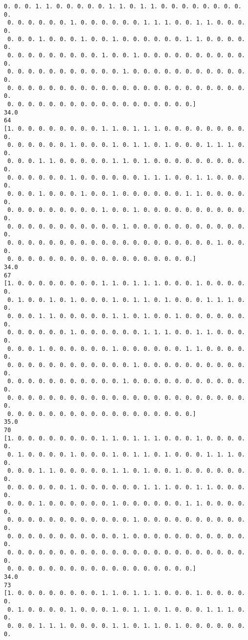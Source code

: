 \documentclass[11pt]{article}
\begin{document}
\begin{Verbatim}[commandchars=\\\{\}]
 0. 0. 0. 1. 1. 0. 0. 0. 0. 0. 1. 1. 0. 1. 1. 0. 0. 0. 0. 0. 0. 0. 0. 0.
 0. 0. 0. 0. 0. 0. 1. 0. 0. 0. 0. 0. 0. 1. 1. 1. 0. 0. 1. 1. 0. 0. 0. 0.
 0. 0. 0. 1. 0. 0. 0. 1. 0. 0. 1. 0. 0. 0. 0. 0. 0. 1. 1. 0. 0. 0. 0. 0.
 0. 0. 0. 0. 0. 0. 0. 0. 0. 1. 0. 0. 1. 0. 0. 0. 0. 0. 0. 0. 0. 0. 0. 0.
 0. 0. 0. 0. 0. 0. 0. 0. 0. 0. 0. 1. 0. 0. 0. 0. 0. 0. 0. 0. 0. 0. 0. 0.
 0. 0. 0. 0. 0. 0. 0. 0. 0. 0. 0. 0. 0. 0. 0. 0. 0. 0. 0. 0. 0. 0. 0. 0.
 0. 0. 0. 0. 0. 0. 0. 0. 0. 0. 0. 0. 0. 0. 0. 0. 0. 0.]
34.0
64
[1. 0. 0. 0. 0. 0. 0. 0. 0. 1. 1. 0. 1. 1. 1. 0. 0. 0. 0. 0. 0. 0. 0. 0.
 0. 0. 0. 0. 0. 0. 1. 0. 0. 0. 1. 0. 1. 1. 0. 1. 0. 0. 0. 1. 1. 1. 0. 0.
 0. 0. 0. 1. 1. 0. 0. 0. 0. 0. 1. 1. 0. 1. 0. 0. 0. 0. 0. 0. 0. 0. 0. 0.
 0. 0. 0. 0. 0. 0. 1. 0. 0. 0. 0. 0. 0. 1. 1. 1. 0. 0. 1. 1. 0. 0. 0. 0.
 0. 0. 0. 1. 0. 0. 0. 1. 0. 0. 1. 0. 0. 0. 0. 0. 0. 1. 1. 0. 0. 0. 0. 0.
 0. 0. 0. 0. 0. 0. 0. 0. 0. 1. 0. 0. 1. 0. 0. 0. 0. 0. 0. 0. 0. 0. 0. 0.
 0. 0. 0. 0. 0. 0. 0. 0. 0. 0. 0. 1. 0. 0. 0. 0. 0. 0. 0. 0. 0. 0. 0. 0.
 0. 0. 0. 0. 0. 0. 0. 0. 0. 0. 0. 0. 0. 0. 0. 0. 0. 0. 0. 0. 1. 0. 0. 0.
 0. 0. 0. 0. 0. 0. 0. 0. 0. 0. 0. 0. 0. 0. 0. 0. 0. 0.]
34.0
67
[1. 0. 0. 0. 0. 0. 0. 0. 0. 1. 1. 0. 1. 1. 1. 0. 0. 0. 1. 0. 0. 0. 0. 0.
 0. 1. 0. 0. 1. 0. 1. 0. 0. 0. 1. 0. 1. 1. 0. 1. 0. 0. 0. 1. 1. 1. 0. 0.
 0. 0. 0. 1. 1. 0. 0. 0. 0. 0. 1. 1. 0. 1. 0. 0. 1. 0. 0. 0. 0. 0. 0. 0.
 0. 0. 0. 0. 0. 0. 1. 0. 0. 0. 0. 0. 0. 1. 1. 1. 0. 0. 1. 1. 0. 0. 0. 0.
 0. 0. 0. 1. 0. 0. 0. 0. 0. 0. 1. 0. 0. 0. 0. 0. 0. 1. 1. 0. 0. 0. 0. 0.
 0. 0. 0. 0. 0. 0. 0. 0. 0. 0. 0. 0. 1. 0. 0. 0. 0. 0. 0. 0. 0. 0. 0. 0.
 0. 0. 0. 0. 0. 0. 0. 0. 0. 0. 0. 1. 0. 0. 0. 0. 0. 0. 0. 0. 0. 0. 0. 0.
 0. 0. 0. 0. 0. 0. 0. 0. 0. 0. 0. 0. 0. 0. 0. 0. 0. 0. 0. 0. 0. 0. 0. 0.
 0. 0. 0. 0. 0. 0. 0. 0. 0. 0. 0. 0. 0. 0. 0. 0. 0. 0.]
35.0
70
[1. 0. 0. 0. 0. 0. 0. 0. 0. 1. 1. 0. 1. 1. 1. 0. 0. 0. 1. 0. 0. 0. 0. 0.
 0. 1. 0. 0. 0. 0. 1. 0. 0. 0. 1. 0. 1. 1. 0. 1. 0. 0. 0. 1. 1. 1. 0. 0.
 0. 0. 0. 1. 1. 0. 0. 0. 0. 0. 1. 1. 0. 1. 0. 0. 1. 0. 0. 0. 0. 0. 0. 0.
 0. 0. 0. 0. 0. 0. 1. 0. 0. 0. 0. 0. 0. 1. 1. 1. 0. 0. 1. 1. 0. 0. 0. 0.
 0. 0. 0. 1. 0. 0. 0. 0. 0. 0. 1. 0. 0. 0. 0. 0. 0. 1. 1. 0. 0. 0. 0. 0.
 0. 0. 0. 0. 0. 0. 0. 0. 0. 0. 0. 0. 1. 0. 0. 0. 0. 0. 0. 0. 0. 0. 0. 0.
 0. 0. 0. 0. 0. 0. 0. 0. 0. 0. 0. 1. 0. 0. 0. 0. 0. 0. 0. 0. 0. 0. 0. 0.
 0. 0. 0. 0. 0. 0. 0. 0. 0. 0. 0. 0. 0. 0. 0. 0. 0. 0. 0. 0. 0. 0. 0. 0.
 0. 0. 0. 0. 0. 0. 0. 0. 0. 0. 0. 0. 0. 0. 0. 0. 0. 0.]
34.0
73
[1. 0. 0. 0. 0. 0. 0. 0. 0. 1. 1. 0. 1. 1. 1. 0. 0. 0. 1. 0. 0. 0. 0. 0.
 0. 1. 0. 0. 0. 0. 1. 0. 0. 0. 1. 0. 1. 1. 0. 1. 0. 0. 0. 1. 1. 1. 0. 0.
 0. 0. 0. 1. 1. 1. 0. 0. 0. 0. 1. 1. 0. 1. 1. 0. 1. 0. 0. 0. 0. 0. 0. 0.

\end{Verbatim}
\end{document}
